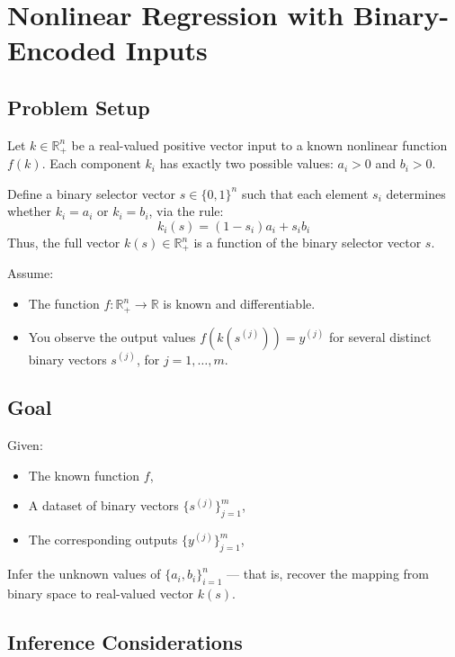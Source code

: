 \documentclass{article}
\begin{document}
\section*{Nonlinear Regression with Binary-Encoded Inputs}

\subsection*{Problem Setup}

Let \( k \in \mathbb{R}_+^n \) be a real-valued positive vector input to a known nonlinear function \( f(k) \). Each component \( k_i \) has exactly two possible values: \( a_i > 0 \) and \( b_i > 0 \). 

Define a binary selector vector \( s \in \{0, 1\}^n \) such that each element \( s_i \) determines whether \( k_i = a_i \) or \( k_i = b_i \), via the rule:
\[
k_i(s) = (1 - s_i) a_i + s_i b_i
\]
Thus, the full vector \( k(s) \in \mathbb{R}_+^n \) is a function of the binary selector vector \( s \).

Assume:
\begin{itemize}
    \item The function \( f : \mathbb{R}_+^n \to \mathbb{R} \) is known and differentiable.
    \item You observe the output values \( f(k(s^{(j)})) = y^{(j)} \) for several distinct binary vectors \( s^{(j)} \), for \( j = 1, \dots, m \).
\end{itemize}

\subsection*{Goal}

Given:
\begin{itemize}
    \item The known function \( f \),
    \item A dataset of binary vectors \( \{s^{(j)}\}_{j=1}^m \),
    \item The corresponding outputs \( \{y^{(j)}\}_{j=1}^m \),
\end{itemize}
Infer the unknown values of \( \{a_i, b_i\}_{i=1}^n \) — that is, recover the mapping from binary space to real-valued vector \( k(s) \).

\subsection*{Inference Considerations}
\end{document}
